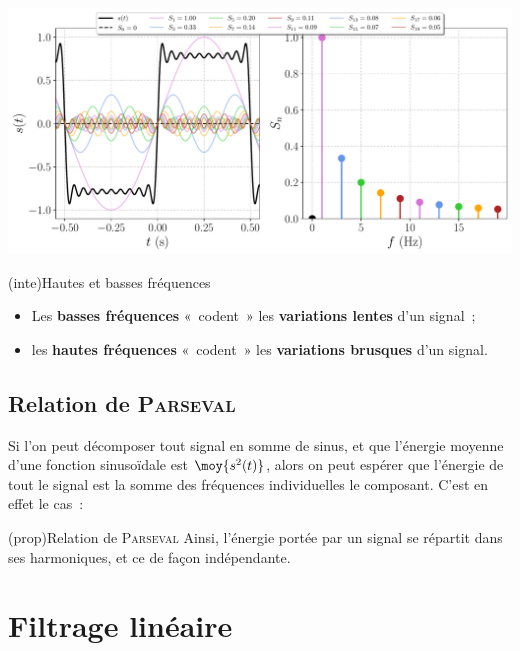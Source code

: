 \documentclass[../../main/main.tex]{subfiles}
\begin{document}
\begin{tcb}[breakable]
	\begin{minipage}{\linewidth}
		\centering
		\includegraphics[width=.85\linewidth]{fft_creneau}
		\vspace{-15pt}
	\end{minipage}
\end{tcb}

\begin{tcb}(inte){Hautes et basses fréquences}
	\begin{itemize}
		\item Les \textbf{basses fréquences} «~codent~» les \textbf{variations
			      lentes} d'un signal~;
		\item les \textbf{hautes fréquences} «~codent~» les \textbf{variations
			      brusques} d'un signal.
	\end{itemize}
\end{tcb}

\subsection{Relation de \textsc{Parseval}}
Si l'on peut décomposer tout signal en somme de sinus, et que l'énergie moyenne
d'une fonction sinusoïdale est $\moy{s^{2}(t)}$, alors on peut espérer que
l'énergie de tout le signal est la somme des fréquences individuelles  le
composant. C'est en effet le cas~:
\begin{tcb}(prop){Relation de \textsc{Parseval}}
	\psw{%
	\[
		\boxed{
		\moy{s^{2}(t)} = s^{2}\ind{eff} =
		S_0{}^{2} + \frac{1}{2} \sum_{n=1}^{+\infty} S_n{}^{2}
		}%
	\]
	}%
	Ainsi, l'énergie portée par un signal se répartit dans ses harmoniques, et ce
	de façon indépendante.
\end{tcb}

\section{Filtrage linéaire}
\end{document}
